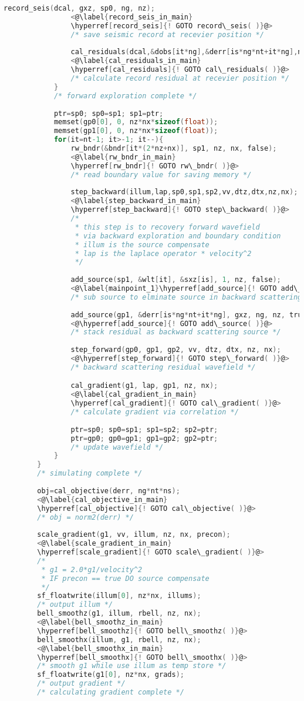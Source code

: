 \documentclass[a4paper,11pt]{article}
\theoremstyle{mytheor}
\begin{document}
\begin{lstlisting}[label={main},language=C,tabsize=4,caption=main()]
				record_seis(dcal, gxz, sp0, ng, nz);
				<@\label{record_seis_in_main}
				\hyperref[record_seis]{! GOTO record\_seis( )}@>
				/* save seismic record at recevier position */
				
				cal_residuals(dcal,&dobs[it*ng],&derr[is*ng*nt+it*ng],ng);
				<@\label{cal_residuals_in_main}
				\hyperref[cal_residuals]{! GOTO cal\_residuals( )}@>
				/* calculate record residual at recevier position */
			}			
			/* forward exploration complete */
			
			ptr=sp0; sp0=sp1; sp1=ptr;
			memset(gp0[0], 0, nz*nx*sizeof(float));
			memset(gp1[0], 0, nz*nx*sizeof(float));
			for(it=nt-1; it>-1; it--){
				rw_bndr(&bndr[it*(2*nz+nx)], sp1, nz, nx, false);
				<@\label{rw_bndr_in_main}
				\hyperref[rw_bndr]{! GOTO rw\_bndr( )}@>
				/* read boundary value for saving memory */
				
				step_backward(illum,lap,sp0,sp1,sp2,vv,dtz,dtx,nz,nx);
				<@\label{step_backward_in_main}
				\hyperref[step_backward]{! GOTO step\_backward( )}@>
				/* 
				 * this step is to recovery forward wavefield 
				 * via backward exploration and boundary condition
				 * illum is the source compensate 
				 * lap is the laplace operator * velocity^2
				 */
				
				add_source(sp1, &wlt[it], &sxz[is], 1, nz, false);
				<@\label{mainpoint_1}\hyperref[add_source]{! GOTO add\_source( )}@>
				/* sub source to elminate source in backward scattering */
				
				add_source(gp1, &derr[is*ng*nt+it*ng], gxz, ng, nz, true);
				<@\hyperref[add_source]{! GOTO add\_source( )}@>
				/* stack residual as backward scattering source */
				
				step_forward(gp0, gp1, gp2, vv, dtz, dtx, nz, nx);
				<@\hyperref[step_forward]{! GOTO step\_forward( )}@>
				/* backward scattering residual wavefield */

				cal_gradient(g1, lap, gp1, nz, nx);
				<@\label{cal_gradient_in_main}
				\hyperref[cal_gradient]{! GOTO cal\_gradient( )}@>
				/* calculate gradient via correlation */
				
				ptr=sp0; sp0=sp1; sp1=sp2; sp2=ptr;
				ptr=gp0; gp0=gp1; gp1=gp2; gp2=ptr;
				/* update wavefield */
			}
		}
		/* simulating complete */
	
		obj=cal_objective(derr, ng*nt*ns);
		<@\label{cal_objective_in_main}
		\hyperref[cal_objective]{! GOTO cal\_objective( )}@>
		/* obj = norm2(derr) */
		
		scale_gradient(g1, vv, illum, nz, nx, precon);
		<@\label{scale_gradient_in_main}
		\hyperref[scale_gradient]{! GOTO scale\_gradient( )}@>
		/* 
		 * g1 = 2.0*g1/velocity^2 
		 * IF precon == true DO source compensate 
		 */		
		sf_floatwrite(illum[0], nz*nx, illums);
		/* output illum */
		bell_smoothz(g1, illum, rbell, nz, nx);
		<@\label{bell_smoothz_in_main}
		\hyperref[bell_smoothz]{! GOTO bell\_smoothz( )}@>
		bell_smoothx(illum, g1, rbell, nz, nx);
		<@\label{bell_smoothx_in_main}
		\hyperref[bell_smoothx]{! GOTO bell\_smoothx( )}@>		
		/* smooth g1 while use illum as temp store */
		sf_floatwrite(g1[0], nz*nx, grads);
		/* output gradient */
		/* calculating gradient complete */
		

\end{lstlisting}
\end{document}
